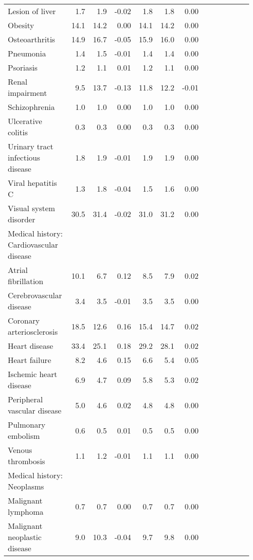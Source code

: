 \documentclass[11pt,]{article}
\begin{document}
\begin{longtable}{lrrrrrrrrrrrr}
      Lesion of liver &  1.7 &  1.9 & -0.02 &  1.8 &  1.8 &  0.00 \\ 
      Obesity & 14.1 & 14.2 &  0.00 & 14.1 & 14.2 &  0.00 \\ 
      Osteoarthritis & 14.9 & 16.7 & -0.05 & 15.9 & 16.0 &  0.00 \\ 
      Pneumonia &  1.4 &  1.5 & -0.01 &  1.4 &  1.4 &  0.00 \\ 
      Psoriasis &  1.2 &  1.1 &  0.01 &  1.2 &  1.1 &  0.00 \\ 
      Renal impairment &  9.5 & 13.7 & -0.13 & 11.8 & 12.2 & -0.01 \\ 
      Schizophrenia &  1.0 &  1.0 &  0.00 &  1.0 &  1.0 &  0.00 \\ 
      Ulcerative colitis &  0.3 &  0.3 &  0.00 &  0.3 &  0.3 &  0.00 \\ 
      Urinary tract infectious disease &  1.8 &  1.9 & -0.01 &  1.9 &  1.9 &  0.00 \\ 
      Viral hepatitis C &  1.3 &  1.8 & -0.04 &  1.5 &  1.6 &  0.00 \\ 
      Visual system disorder & 30.5 & 31.4 & -0.02 & 31.0 & 31.2 &  0.00 \\ 
  Medical history: Cardiovascular disease &    &    &     &    &    &     \\ 
      Atrial fibrillation & 10.1 &  6.7 &  0.12 &  8.5 &  7.9 &  0.02 \\ 
      Cerebrovascular disease &  3.4 &  3.5 & -0.01 &  3.5 &  3.5 &  0.00 \\ 
      Coronary arteriosclerosis & 18.5 & 12.6 &  0.16 & 15.4 & 14.7 &  0.02 \\ 
      Heart disease & 33.4 & 25.1 &  0.18 & 29.2 & 28.1 &  0.02 \\ 
      Heart failure &  8.2 &  4.6 &  0.15 &  6.6 &  5.4 &  0.05 \\ 
      Ischemic heart disease &  6.9 &  4.7 &  0.09 &  5.8 &  5.3 &  0.02 \\ 
      Peripheral vascular disease &  5.0 &  4.6 &  0.02 &  4.8 &  4.8 &  0.00 \\ 
      Pulmonary embolism &  0.6 &  0.5 &  0.01 &  0.5 &  0.5 &  0.00 \\ 
      Venous thrombosis &  1.1 &  1.2 & -0.01 &  1.1 &  1.1 &  0.00 \\ 
  Medical history: Neoplasms &    &    &     &    &    &     \\ 
      Malignant lymphoma &  0.7 &  0.7 &  0.00 &  0.7 &  0.7 &  0.00 \\ 
      Malignant neoplastic disease &  9.0 & 10.3 & -0.04 &  9.7 &  9.8 &  0.00 \\ 

\end{longtable}
\end{document}
